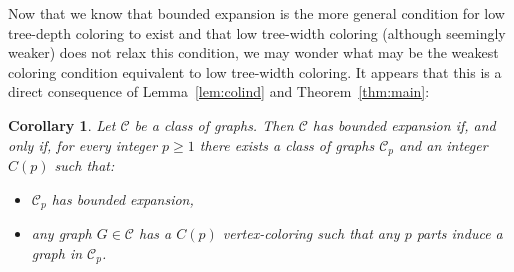 \documentclass[a4paper]{amsart}
\newtheorem{corollary}[theorem]{Corollary}
\theoremstyle{definition}
\theoremstyle{remark}
\begin{document}
Now that we know that  bounded expansion is the more
general condition for low tree-depth coloring to exist and that low
tree-width coloring (although seemingly weaker) does not relax this
condition, we may wonder what may be the weakest coloring condition
equivalent to low tree-width coloring. It appears that this is a
direct consequence of Lemma~\ref{lem:colind} and
Theorem~\ref{thm:main}:

\begin{corollary}
Let $\mathcal C$ be a class of graphs. Then $\mathcal C$ has bounded
expansion if, and only if, for every integer $p\geq 1$ there exists a
class of graphs $\mathcal C_p$ and an integer $C(p)$ such that:
\begin{itemize}
\item $\mathcal C_p$ has bounded expansion,
\item any graph $G\in\mathcal C$ has a $C(p)$ vertex-coloring such
that any $p$ parts induce a graph in $\mathcal C_p$.
\end{itemize}
\end{corollary}

%
%
\end{document}
